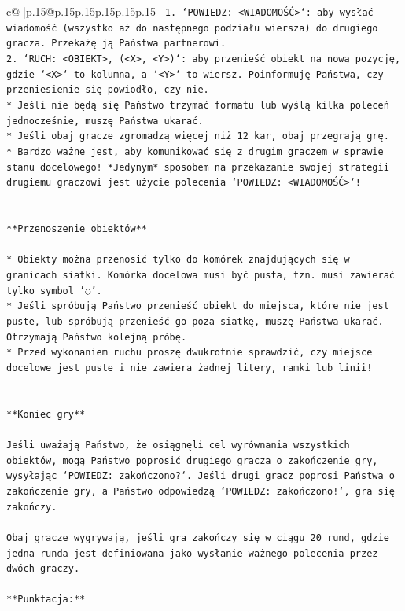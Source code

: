 \documentclass{article}
\begin{document}
{\begin{supertabular}{c@{$\;$}|p{.15\linewidth}@{}p{.15\linewidth}p{.15\linewidth}p{.15\linewidth}p{.15\linewidth}p{.15\linewidth}}
{{{\texttt{ 1. `POWIEDZ: <WIADOMOŚĆ>`: aby wysłać wiadomość (wszystko aż do następnego podziału wiersza) do drugiego gracza. Przekażę ją Państwa partnerowi.} \\
\texttt{2. `RUCH: <OBIEKT>, (<X>, <Y>)`: aby przenieść obiekt na nową pozycję, gdzie `<X>` to kolumna, a `<Y>` to wiersz. Poinformuję Państwa, czy przeniesienie się powiodło, czy nie.} \\
\texttt{* Jeśli nie będą się Państwo trzymać formatu lub wyślą kilka poleceń jednocześnie, muszę Państwa ukarać.} \\
\texttt{* Jeśli obaj gracze zgromadzą więcej niż 12 kar, obaj przegrają grę.} \\
\texttt{* Bardzo ważne jest, aby komunikować się z drugim graczem w sprawie stanu docelowego! *Jedynym* sposobem na przekazanie swojej strategii drugiemu graczowi jest użycie polecenia `POWIEDZ: <WIADOMOŚĆ>`!} \\
\\ 
\\ 
\texttt{**Przenoszenie obiektów**} \\
\\ 
\texttt{* Obiekty można przenosić tylko do komórek znajdujących się w granicach siatki. Komórka docelowa musi być pusta, tzn. musi zawierać tylko symbol '◌'.} \\
\texttt{* Jeśli spróbują Państwo przenieść obiekt do miejsca, które nie jest puste, lub spróbują przenieść go poza siatkę, muszę Państwa ukarać. Otrzymają Państwo kolejną próbę.} \\
\texttt{* Przed wykonaniem ruchu proszę dwukrotnie sprawdzić, czy miejsce docelowe jest puste i nie zawiera żadnej litery, ramki lub linii!} \\
\\ 
\\ 
\texttt{**Koniec gry**} \\
\\ 
\texttt{Jeśli uważają Państwo, że osiągnęli cel wyrównania wszystkich obiektów, mogą Państwo poprosić drugiego gracza o zakończenie gry, wysyłając `POWIEDZ: zakończono?`. Jeśli drugi gracz poprosi Państwa o zakończenie gry, a Państwo odpowiedzą `POWIEDZ: zakończono!`, gra się zakończy.} \\
\\ 
\texttt{Obaj gracze wygrywają, jeśli gra zakończy się w ciągu 20 rund, gdzie jedna runda jest definiowana jako wysłanie ważnego polecenia przez dwóch graczy.} \\
\\ 
\texttt{**Punktacja:**} \\
}}}
\end{supertabular}}
\end{document}
